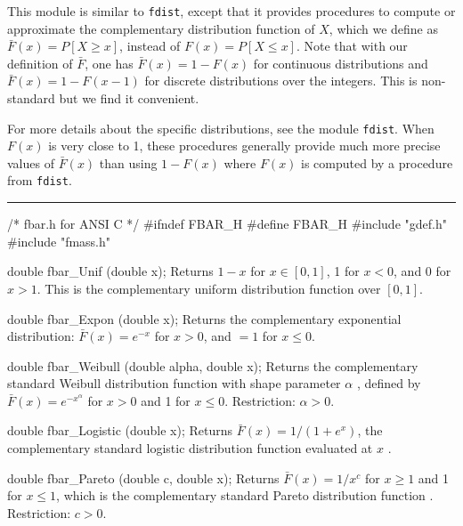
This module is similar to {\tt fdist}, except that it provides procedures
to compute or approximate the complementary distribution function of $X$,
which we define as $\bar F(x) = P[X\ge x]$, instead of $F(x)=P[X\le x]$.
Note that with our definition of $\bar F$, one has
$\bar F(x) = 1 - F(x)$ for continuous distributions and
$\bar F(x) = 1 - F(x-1)$ for discrete distributions over the integers.
This is non-standard but we find it convenient.

For more details about the specific distributions, 
see the module {\tt fdist}.
When $F(x)$ is very close to 1, these procedures generally provide much 
more precise values of $\bar F(x)$ than using $1-F(x)$ where $F(x)$ is
computed by a procedure from {\tt fdist}.


\bigskip
\hrule
\code\hide
/* fbar.h for ANSI C */
#ifndef FBAR_H
#define FBAR_H
\endhide
#include "gdef.h"
#include "fmass.h"
\endcode


\code

double fbar_Unif (double x);
\endcode
  \tab
  Returns $1-x$ for $x \in [0, 1]$, 1 for $x<0$, and 0 for $x>1$.
  This is the complementary uniform distribution function over $[0, 1]$.
 \endtab
\code


double fbar_Expon (double x);
\endcode
  \tab
  Returns the complementary exponential distribution:
  $\bar F(x) = e^{- x}$ for $x>0$, and $=1$ for $x\le 0$.
 \endtab
\code


double fbar_Weibull (double alpha, double x);
\endcode
  \tab
  Returns the complementary standard Weibull distribution function 
  with shape parameter $\alpha$ \cite{tJOH95a}, defined by 
  $\bar F(x) = e^{- x^\alpha}$ for $x>0$ and 1 for $x\le 0$.
  Restriction: $\alpha > 0$.
 \endtab
\code


double fbar_Logistic (double x);
\endcode
  \tab
  Returns $\bar F(x) = 1/(1 + e^{x})$, the complementary standard 
  logistic distribution function evaluated at $x$ \cite{tJOH95b}.
 \endtab
\code


double fbar_Pareto (double c, double x);
\endcode
  \tab
  Returns $\bar F(x) = 1/x^c$ for $x\ge 1$ and 1 for $x\le 1$, 
  which is the complementary standard Pareto
  distribution function \cite{tJOH95a}.
  Restriction: $c > 0$.
 \endtab
\code


